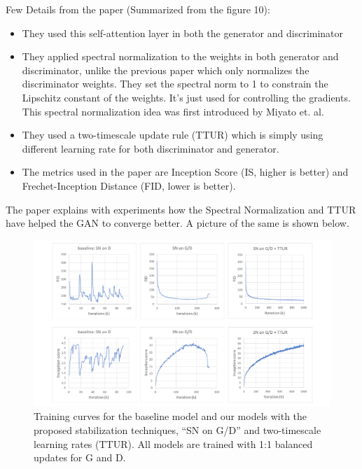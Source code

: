 \documentclass{article}
\begin{document}
Few Details from the paper (Summarized from the figure 10):
\begin{itemize}
    \item They used this self-attention layer in both the generator and discriminator
    \item They applied spectral normalization to the weights in both generator and discriminator, unlike the previous paper which only normalizes the discriminator weights. They set the spectral norm to 1 to constrain the Lipschitz constant of the weights. It’s just used for controlling the gradients. This spectral normalization idea was first introduced by Miyato et. al.
    \item They used a two-timescale update rule (TTUR) which is simply using different learning rate for both discriminator and generator.
    \item The metrics used in the paper are Inception Score (IS, higher is better) and Frechet-Inception Distance (FID, lower is better).
\end{itemize}

The paper explains with experiments how the Spectral Normalization and TTUR have helped the GAN to converge better. A picture of the same is shown below.
\medskip


\begin{figure}[h]
    \centering
    \includegraphics[width=1\textwidth]{images/stablize_summary.png}
    \caption{Training curves for the baseline model and our models with the proposed stabilization techniques, “SN on G/D” and two-timescale learning rates (TTUR). All models are trained with 1:1 balanced updates for G and D.}
    \label{fig:mesh1}
\end{figure}
\end{document}
